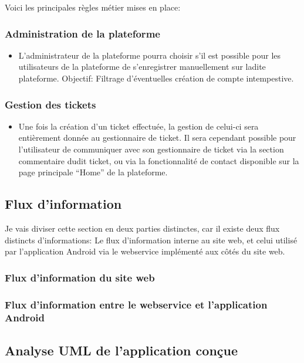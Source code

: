 \documentclass[12pt,table,a4paper]{report}
\begin{document}
Voici les principales règles métier mises en place:

\subsubsection{Administration de la plateforme}
\begin{itemize}
	\item{L'administrateur de la plateforme pourra choisir s'il est possible pour les utilisateurs de la plateforme de s'enregistrer manuellement sur ladite plateforme. Objectif: Filtrage d'éventuelles création de compte intempestive.}
\end{itemize}

\subsubsection{Gestion des tickets}
\begin{itemize}
	\item{Une fois la création d'un ticket effectuée, la gestion de celui-ci sera entièrement donnée au gestionnaire de ticket. Il sera cependant possible pour l'utilisateur de communiquer avec son gestionnaire de ticket via la section commentaire dudit ticket, ou via la fonctionnalité de contact disponible sur la page principale "`Home"' de la plateforme.}
\end{itemize}

\subsection{Flux d'information}
Je vais diviser cette section en deux parties distinctes, car il existe deux flux distincts d'informations: Le flux d'information interne au site web, et celui utilisé par l'application Android via le webservice implémenté aux côtés du site web.

\subsubsection{Flux d'information du site web}

\subsubsection{Flux d'information entre le webservice et l'application Android}

\subsection{Analyse UML de l'application conçue}
\end{document}
